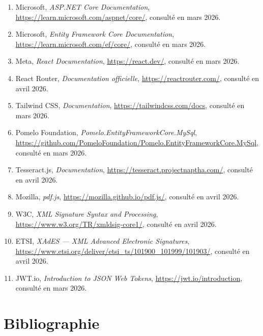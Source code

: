 \documentclass[a4paper,12pt]{report}
\begin{document}
\begin{enumerate}[nosep]
    \item Microsoft, \textit{ASP.NET Core Documentation}, \url{https://learn.microsoft.com/aspnet/core/}, consulté en mars 2026.
    \item Microsoft, \textit{Entity Framework Core Documentation}, \url{https://learn.microsoft.com/ef/core/}, consulté en mars 2026.
    \item Meta, \textit{React Documentation}, \url{https://react.dev/}, consulté en mars 2026.
    \item React Router, \textit{Documentation officielle}, \url{https://reactrouter.com/}, consulté en avril 2026.
    \item Tailwind CSS, \textit{Documentation}, \url{https://tailwindcss.com/docs}, consulté en mars 2026.
    \item Pomelo Foundation, \textit{Pomelo.EntityFrameworkCore.MySql}, \url{https://github.com/PomeloFoundation/Pomelo.EntityFrameworkCore.MySql}, consulté en mars 2026.
    \item Tesseract.js, \textit{Documentation}, \url{https://tesseract.projectnaptha.com/}, consulté en avril 2026.
    \item Mozilla, \textit{pdf.js}, \url{https://mozilla.github.io/pdf.js/}, consulté en avril 2026.
    \item W3C, \textit{XML Signature Syntax and Processing}, \url{https://www.w3.org/TR/xmldsig-core1/}, consulté en avril 2026.
    \item ETSI, \textit{XAdES — XML Advanced Electronic Signatures}, \url{https://www.etsi.org/deliver/etsi_ts/101900_101999/101903/}, consulté en avril 2026.
    \item JWT.io, \textit{Introduction to JSON Web Tokens}, \url{https://jwt.io/introduction}, consulté en mars 2026.
\end{enumerate}


\chapter*{Bibliographie}
\end{document}
